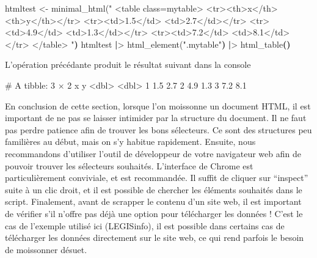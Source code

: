 \documentclass[
  letterpaper,
  DIV=11,
  numbers=noendperiod]{scrreprt}
\newenvironment{Shaded}{\begin{snugshade}}{\end{snugshade}}
\newcommand{\CommentTok}[1]{\textcolor[rgb]{0.37,0.37,0.37}{#1}}
\newcommand{\ErrorTok}[1]{\textcolor[rgb]{0.68,0.00,0.00}{#1}}
\newcommand{\ExtensionTok}[1]{\textcolor[rgb]{0.00,0.23,0.31}{#1}}
\newcommand{\KeywordTok}[1]{\textcolor[rgb]{0.00,0.23,0.31}{\textbf{#1}}}
\newcommand{\NormalTok}[1]{\textcolor[rgb]{0.00,0.23,0.31}{#1}}
\newcommand{\OperatorTok}[1]{\textcolor[rgb]{0.37,0.37,0.37}{#1}}
\newcommand{\StringTok}[1]{\textcolor[rgb]{0.13,0.47,0.30}{#1}}
\begin{document}
\begin{Shaded}
\begin{Highlighting}[]
\ExtensionTok{htmltest} \OperatorTok{\textless{}}\NormalTok{{-} minimal\_html}\ErrorTok{(}\StringTok{"}
\StringTok{  \textless{}table class=\textquotesingle{}mytable\textquotesingle{}\textgreater{}}
\StringTok{\textless{}tr\textgreater{}\textless{}th\textgreater{}x\textless{}/th\textgreater{}   \textless{}th\textgreater{}y\textless{}/th\textgreater{}\textless{}/tr\textgreater{}}
\StringTok{\textless{}tr\textgreater{}\textless{}td\textgreater{}1.5\textless{}/td\textgreater{} \textless{}td\textgreater{}2.7\textless{}/td\textgreater{}\textless{}/tr\textgreater{}}
\StringTok{\textless{}tr\textgreater{}\textless{}td\textgreater{}4.9\textless{}/td\textgreater{} \textless{}td\textgreater{}1.3\textless{}/td\textgreater{}\textless{}/tr\textgreater{}}
\StringTok{\textless{}tr\textgreater{}\textless{}td\textgreater{}7.2\textless{}/td\textgreater{} \textless{}td\textgreater{}8.1\textless{}/td\textgreater{}\textless{}/tr\textgreater{}}
\StringTok{\textless{}/table\textgreater{}}
\StringTok{  "}\KeywordTok{)}
  \ExtensionTok{htmltest} \KeywordTok{|}\OperatorTok{\textgreater{}}
  \ExtensionTok{html\_element}\ErrorTok{(}\StringTok{".mytable"}\KeywordTok{)} \KeywordTok{|}\OperatorTok{\textgreater{}}\NormalTok{ html\_table}\KeywordTok{()}
\end{Highlighting}
\end{Shaded}

L'opération précédante produit le résultat suivant dans la console

\begin{Shaded}
\begin{Highlighting}[]
\CommentTok{\# A tibble: 3 × 2}
      \ExtensionTok{x}\NormalTok{     y}
  \OperatorTok{\textless{}}\NormalTok{dbl}\OperatorTok{\textgreater{}} \OperatorTok{\textless{}}\NormalTok{dbl}\OperatorTok{\textgreater{}}
\ExtensionTok{1}\NormalTok{   1.5   2.7}
\ExtensionTok{2}\NormalTok{   4.9   1.3}
\ExtensionTok{3}\NormalTok{   7.2   8.1}
\end{Highlighting}
\end{Shaded}

En conclusion de cette section, lorsque l'on moissonne un document HTML,
il est important de ne pas se laisser intimider par la structure du
document. Il ne faut pas perdre patience afin de trouver les bons
sélecteurs. Ce sont des structures peu familières au début, mais on s'y
habitue rapidement. Ensuite, nous recommandons d'utiliser l'outil de
développeur de votre navigateur web afin de pouvoir trouver les
sélecteurs souhaités. L'interface de Chrome est particulièrement
conviviale, et est recommandée. Il suffit de cliquer sur ``inspect''
suite à un clic droit, et il est possible de chercher les éléments
souhaités dans le script. Finalement, avant de scrapper le contenu d'un
site web, il est important de vérifier s'il n'offre pas déjà une option
pour télécharger les données ! C'est le cas de l'exemple utilisé ici
(LEGISinfo), il est possible dans certains cas de télécharger les
données directement sur le site web, ce qui rend parfois le besoin de
moissonner désuet.
\end{document}
